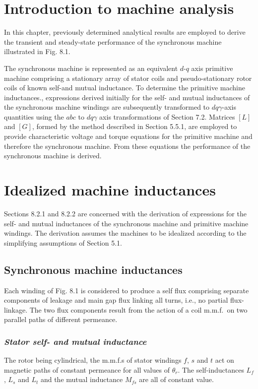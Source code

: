 \documentclass[a4paper,numbers=noenddot,12pt]{scrbook}
\begin{document}
\section{Introduction to machine analysis }
In this chapter, previously determined analytical results are employed to derive the transient and steady-state performance of the synchronous machine illustrated in Fig. 8.1. 

The synchronous machine is represented as an equivalent $d$-$q$ axis primitive machine comprising a stationary array of stator coils and pseudo-stationary rotor coils of known self-and mutual inductance. To determine the primitive machine inductances., expressions derived initially for the self- and mutual inductances of the synchronous machine windings are subsequently transformed to $d q \gamma$-axis quantities using the $abc$ to $d q \gamma$ axis transformations of Section 7.2. Matrices
$[L]$ and $[G]$,  formed by the method described in Section 5.5.1, are employed to provide characteristic voltage and torque equations for the primitive machine and therefore the synchronous machine. From these equations the performance of the synchronous machine is derived. 

\section{Idealized machine inductances}
Sections 8.2.1 and 8.2.2 are concerned with the derivation of expressions for the self- and mutual inductances of the synchronous machine and primitive machine windings. The derivation assumes the machines to be idealized according to the simplifying assumptions of Section 5.1.

\subsection{Synchronous machine inductances}
Each winding of Fig. 8.1 is considered to produce a self flux comprising separate components of leakage and main gap flux linking all turns, i.e., no partial flux-linkage. The two flux components result from the action of a coil m.m.f.\ on two parallel paths of different permeance.

\subsubsection{\textit{Stator self- and mutual inductance}} The rotor being cylindrical, the m.m.f.s of stator windings $f$, $s$ and $t$ act on magnetic paths of constant permeance for all values of $\theta_r$. The self-inductances $L_f$, $L_s$ and $L_t$ and the mutual inductance $M_{fs}$ are all of constant value.
\end{document}
